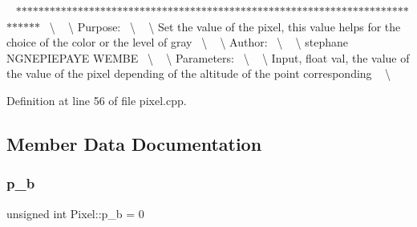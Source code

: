 ~\newline
$\ast$$\ast$$\ast$$\ast$$\ast$$\ast$$\ast$$\ast$$\ast$$\ast$$\ast$$\ast$$\ast$$\ast$$\ast$$\ast$$\ast$$\ast$$\ast$$\ast$$\ast$$\ast$$\ast$$\ast$$\ast$$\ast$$\ast$$\ast$$\ast$$\ast$$\ast$$\ast$$\ast$$\ast$$\ast$$\ast$$\ast$$\ast$$\ast$$\ast$$\ast$$\ast$$\ast$$\ast$$\ast$$\ast$$\ast$$\ast$$\ast$$\ast$$\ast$$\ast$$\ast$$\ast$$\ast$$\ast$$\ast$$\ast$$\ast$$\ast$$\ast$$\ast$$\ast$$\ast$$\ast$$\ast$$\ast$$\ast$$\ast$$\ast$$\ast$$\ast$$\ast$$\ast$$\ast$$\ast$~\newline
\textbackslash{} ~\newline
\textbackslash{} Purpose\+:~\newline
\textbackslash{} ~\newline
\textbackslash{} Set the value of the pixel, this value helps for the choice of the color or the level of gray~\newline
\textbackslash{} ~\newline
\textbackslash{} Author\+:~\newline
\textbackslash{} ~\newline
\textbackslash{} stephane N\+G\+N\+E\+P\+I\+E\+P\+A\+YE W\+E\+M\+BE~\newline
\textbackslash{} ~\newline
\textbackslash{} Parameters\+:~\newline
\textbackslash{} ~\newline
\textbackslash{} Input, float val, the value of the value of the pixel depending of the altitude of the point corresponding ~\newline
\textbackslash{} ~\newline


Definition at line 56 of file pixel.\+cpp.



\subsection{Member Data Documentation}
\mbox{\label{class_pixel_a9521bc43c95cfcb25a11b03e176ad6a1}} 
\subsubsection{\texorpdfstring{p\+\_\+b}{p\_b}}
{\footnotesize\ttfamily unsigned int Pixel\+::p\+\_\+b = 0}



